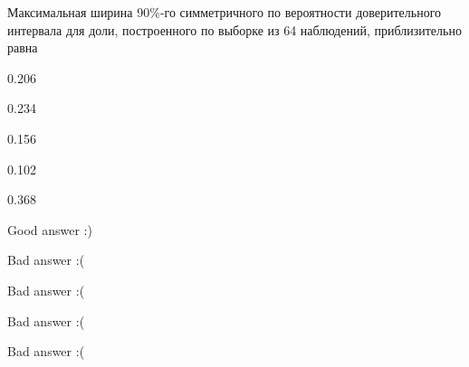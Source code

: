
\begin{question}
Максимальная ширина 90\%-го симметричного по вероятности доверительного
интервала для доли, построенного по выборке из 64 наблюдений,
приблизительно равна
\begin{answerlist}
  \item 0.206
  \item 0.234
  \item 0.156
  \item 0.102
  \item 0.368
\end{answerlist}
\end{question}

\begin{solution}
\begin{answerlist}
  \item Good answer :)
  \item Bad answer :(
  \item Bad answer :(
  \item Bad answer :(
  \item Bad answer :(
\end{answerlist}
\end{solution}

